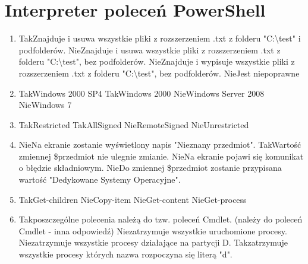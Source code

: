 

\newpage
\section{Interpreter poleceń PowerShell}
	\begin{enumerate}
		\item {}%
		{Tak}{Znajduje i usuwa wszystkie pliki z rozszerzeniem .txt z folderu "C:\textbackslash test" i podfolderów.}%
		{Nie}{Znajduje i usuwa wszystkie pliki z rozszerzeniem .txt z folderu "C:\textbackslash test", bez podfolderów.}%
		{Nie}{Znajduje i wypisuje wszystkie pliki z rozszerzeniem .txt z folderu "C:\textbackslash test", bez podfolderów.}%
		{Nie}{Jest niepoprawne}
		\item {}%
		{Tak}{Windows 2000 SP4}%
		{Tak}{Windows 2000}%
		{Nie}{Windows Server 2008}%
		{Nie}{Windows 7}
		\item {}%
		{Tak}{Restricted}%
		{Tak}{AllSigned}%
		{Nie}{RemoteSigned}%
		{Nie}{Unrestricted}
		\item {}%
		{Nie}{Na ekranie zostanie wyświetlony napis "Nieznany przedmiot".}%
		{Tak}{Wartość zmiennej \$przedmiot nie ulegnie zmianie.}%
		{Nie}{Na ekranie pojawi się komunikat o błędzie składniowym.}%
		{Nie}{Do zmiennej \$przedmiot zostanie przypisana wartość "Dedykowane Systemy Operacyjne".}
		\item {}%
		{Tak}{Get-children}%
		{Nie}{Copy-item}%
		{Nie}{Get-content}%
		{Nie}{Get-process}
		\item {}%
		{Tak}{poszczególne polecenia należą do tzw. poleceń Cmdlet. (należy do poleceń Cmdlet - inna odpowiedź) }%
		{Nie}{zatrzymuje wszystkie uruchomione procesy.}%
		{Nie}{zatrzymuje wszystkie procesy działające na partycji D.}%
		{Tak}{zatrzymuje wszystkie procesy których nazwa rozpoczyna się literą "d".}
		

\end{enumerate}
